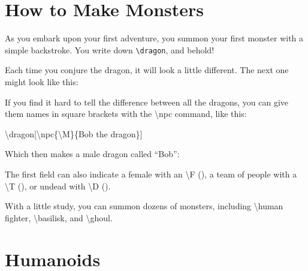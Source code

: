 \documentclass{report}
\date{\today}
\begin{document}
\chapter{How to Make Monsters}

\begin{multicols}{2}

\begin{boxtext}

As you embark upon your first adventure, you summon your first monster with a simple backstroke.  You write down {\tt \textbackslash dragon}, and behold!

\end{boxtext}

\dragon

Each time you conjure the dragon, it will look a little different.
The next one might look like this:

\dragon

If you find it hard to tell the difference between all the dragons, you can give them names in square brackets with the \textbackslash npc command, like this:

\textbackslash dragon[\textbackslash npc\{\textbackslash M\}\{Bob the dragon\}] 

Which then makes a male dragon called ``Bob'':


The first field can also indicate a female with an \textbackslash F (\F), a team of people with a \textbackslash T (\T), or undead with \textbackslash D (\D).

With a little study, you can summon dozens of monsters, including \textbackslash human fighter, \textbackslash basilisk, and \textbackslash ghoul.

\end{multicols}

\chapter{Humanoids}
\end{document}
